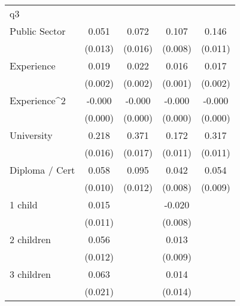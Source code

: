 {\begin{tabular}{l*{4}{c}}
\hline
q3                  &                     &                     &                     &                     \\
Public Sector       &       0.051\sym{***}&       0.072\sym{***}&       0.107\sym{***}&       0.146\sym{***}\\
                    &     (0.013)         &     (0.016)         &     (0.008)         &     (0.011)         \\
[1em]
Experience          &       0.019\sym{***}&       0.022\sym{***}&       0.016\sym{***}&       0.017\sym{***}\\
                    &     (0.002)         &     (0.002)         &     (0.001)         &     (0.002)         \\
[1em]
Experience^{2}      &      -0.000\sym{***}&      -0.000\sym{***}&      -0.000\sym{***}&      -0.000\sym{***}\\
                    &     (0.000)         &     (0.000)         &     (0.000)         &     (0.000)         \\
[1em]
University          &       0.218\sym{***}&       0.371\sym{***}&       0.172\sym{***}&       0.317\sym{***}\\
                    &     (0.016)         &     (0.017)         &     (0.011)         &     (0.011)         \\
[1em]
Diploma / Cert      &       0.058\sym{***}&       0.095\sym{***}&       0.042\sym{***}&       0.054\sym{***}\\
                    &     (0.010)         &     (0.012)         &     (0.008)         &     (0.009)         \\
[1em]
1 child             &       0.015         &                     &      -0.020\sym{**} &                     \\
                    &     (0.011)         &                     &     (0.008)         &                     \\
[1em]
2 children          &       0.056\sym{***}&                     &       0.013         &                     \\
                    &     (0.012)         &                     &     (0.009)         &                     \\
[1em]
3 children          &       0.063\sym{**} &                     &       0.014         &                     \\
                    &     (0.021)         &                     &     (0.014)         &                     \\

\end{tabular}}
